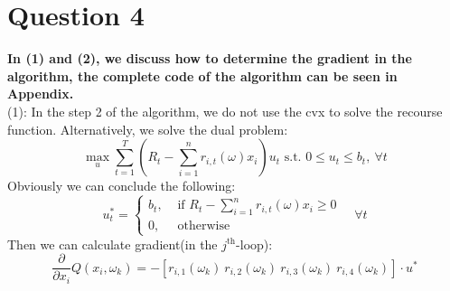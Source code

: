 \documentclass[11pt,a4paper]{article}
\begin{document}
\section*{Question 4}
\textbf{In (1) and (2), we discuss how to determine the gradient in the algorithm, the complete code of the algorithm can be seen in Appendix.}\\
(1): In the step 2 of the algorithm, we do not use the cvx to solve the recourse function. Alternatively, we solve the dual problem: 
$$
\max _{u} \sum_{t=1}^{T}\left(R_{t}-\sum_{i=1}^{n} r_{i, t}(\omega) x_{i}\right) u_{t} \text { s.t. } 0 \leq u_{t} \leq b_{t},\  \forall t
$$
Obviously we can conclude the following: $$
u_{t}^{*}=\left\{\begin{array}{ll}
b_{t}, & \text { if } R_{t}-\sum_{i=1}^{n} r_{i, t}(\omega) x_{i} \geq 0 \\
0, & \text { otherwise }
\end{array} \quad \forall t\right.
$$
Then we can calculate gradient(in the $j^{\text{th}}$-loop):
$$
\frac{\partial }{\partial x_{i}}Q(x_{i},\omega_{k})=-\left[r_{i,1}(\omega_{k}) \ r_{i,2}(\omega_{k}) \ r_{i,3}(\omega_{k})\ r_{i,4}(\omega_{k}) \right]\cdot u^{*}
$$
\end{document}
